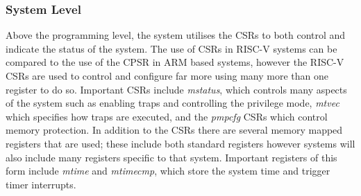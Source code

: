 \subsubsection{System Level}
Above the programming level, the system utilises the CSRs to both control and indicate the status of the system. The use of CSRs in RISC-V systems can be compared to the use of the CPSR in ARM based systems, however the RISC-V CSRs are used to control and configure far more using many more than one register to do so. Important CSRs include \textit{mstatus}, which controls many aspects of the system such as enabling traps and controlling the privilege mode, \textit{mtvec} which specifies how traps are executed, and the \textit{pmpcfg} CSRs which control memory protection. In addition to the CSRs there are several memory mapped registers that are used; these include both standard registers however systems will also include many registers specific to that system. Important registers of this form include \textit{mtime} and \textit{mtimecmp}, which store the system time and trigger timer interrupts.
